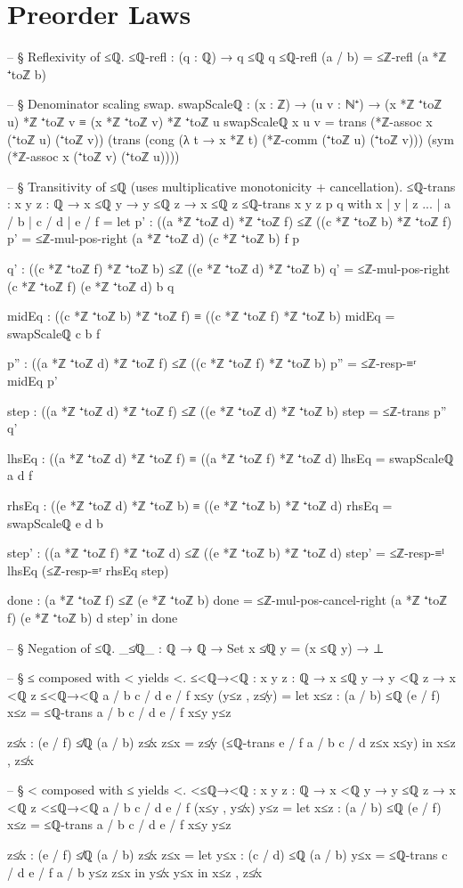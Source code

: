 \documentclass[11pt,a4paper]{book}
\begin{document}
\section{Preorder Laws}

\begin{code}
-- § Reflexivity of ≤ℚ.
≤ℚ-refl : (q : ℚ) → q ≤ℚ q
≤ℚ-refl (a / b) = ≤ℤ-refl (a *ℤ ⁺toℤ b)

-- § Denominator scaling swap.
swapScaleℚ : (x : ℤ) → (u v : ℕ⁺) → (x *ℤ ⁺toℤ u) *ℤ ⁺toℤ v ≡ (x *ℤ ⁺toℤ v) *ℤ ⁺toℤ u
swapScaleℚ x u v =
  trans
    (*ℤ-assoc x (⁺toℤ u) (⁺toℤ v))
    (trans
      (cong (λ t → x *ℤ t) (*ℤ-comm (⁺toℤ u) (⁺toℤ v)))
      (sym (*ℤ-assoc x (⁺toℤ v) (⁺toℤ u))))

-- § Transitivity of ≤ℚ (uses multiplicative monotonicity + cancellation).
≤ℚ-trans : {x y z : ℚ} → x ≤ℚ y → y ≤ℚ z → x ≤ℚ z
≤ℚ-trans {x} {y} {z} p q with x | y | z
... | a / b | c / d | e / f =
  let
    p' : ((a *ℤ ⁺toℤ d) *ℤ ⁺toℤ f) ≤ℤ ((c *ℤ ⁺toℤ b) *ℤ ⁺toℤ f)
    p' = ≤ℤ-mul-pos-right (a *ℤ ⁺toℤ d) (c *ℤ ⁺toℤ b) f p

    q' : ((c *ℤ ⁺toℤ f) *ℤ ⁺toℤ b) ≤ℤ ((e *ℤ ⁺toℤ d) *ℤ ⁺toℤ b)
    q' = ≤ℤ-mul-pos-right (c *ℤ ⁺toℤ f) (e *ℤ ⁺toℤ d) b q

    midEq : ((c *ℤ ⁺toℤ b) *ℤ ⁺toℤ f) ≡ ((c *ℤ ⁺toℤ f) *ℤ ⁺toℤ b)
    midEq = swapScaleℚ c b f

    p'' : ((a *ℤ ⁺toℤ d) *ℤ ⁺toℤ f) ≤ℤ ((c *ℤ ⁺toℤ f) *ℤ ⁺toℤ b)
    p'' = ≤ℤ-resp-≡ʳ midEq p'

    step : ((a *ℤ ⁺toℤ d) *ℤ ⁺toℤ f) ≤ℤ ((e *ℤ ⁺toℤ d) *ℤ ⁺toℤ b)
    step = ≤ℤ-trans p'' q'

    lhsEq : ((a *ℤ ⁺toℤ d) *ℤ ⁺toℤ f) ≡ ((a *ℤ ⁺toℤ f) *ℤ ⁺toℤ d)
    lhsEq = swapScaleℚ a d f

    rhsEq : ((e *ℤ ⁺toℤ d) *ℤ ⁺toℤ b) ≡ ((e *ℤ ⁺toℤ b) *ℤ ⁺toℤ d)
    rhsEq = swapScaleℚ e d b

    step' : ((a *ℤ ⁺toℤ f) *ℤ ⁺toℤ d) ≤ℤ ((e *ℤ ⁺toℤ b) *ℤ ⁺toℤ d)
    step' = ≤ℤ-resp-≡ˡ lhsEq (≤ℤ-resp-≡ʳ rhsEq step)

    done : (a *ℤ ⁺toℤ f) ≤ℤ (e *ℤ ⁺toℤ b)
    done = ≤ℤ-mul-pos-cancel-right (a *ℤ ⁺toℤ f) (e *ℤ ⁺toℤ b) d step'
  in
  done

-- § Negation of ≤ℚ.
_≰ℚ_ : ℚ → ℚ → Set
x ≰ℚ y = (x ≤ℚ y) → ⊥

-- § ≤ composed with < yields <.
≤<ℚ→<ℚ : {x y z : ℚ} → x ≤ℚ y → y <ℚ z → x <ℚ z
≤<ℚ→<ℚ {a / b} {c / d} {e / f} x≤y (y≤z , z≰y) =
  let
    x≤z : (a / b) ≤ℚ (e / f)
    x≤z = ≤ℚ-trans {a / b} {c / d} {e / f} x≤y y≤z

    z≰x : (e / f) ≰ℚ (a / b)
    z≰x z≤x = z≰y (≤ℚ-trans {e / f} {a / b} {c / d} z≤x x≤y)
  in
  x≤z , z≰x

-- § < composed with ≤ yields <.
<≤ℚ→<ℚ : {x y z : ℚ} → x <ℚ y → y ≤ℚ z → x <ℚ z
<≤ℚ→<ℚ {a / b} {c / d} {e / f} (x≤y , y≰x) y≤z =
  let
    x≤z : (a / b) ≤ℚ (e / f)
    x≤z = ≤ℚ-trans {a / b} {c / d} {e / f} x≤y y≤z

    z≰x : (e / f) ≰ℚ (a / b)
    z≰x z≤x =
      let
        y≤x : (c / d) ≤ℚ (a / b)
        y≤x = ≤ℚ-trans {c / d} {e / f} {a / b} y≤z z≤x
      in
      y≰x y≤x
  in
  x≤z , z≰x
\end{code}
\end{document}
